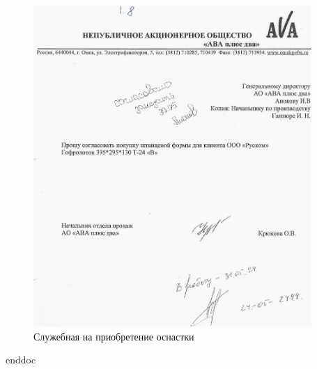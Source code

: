  \begin{figure}
 \begin{center}
   \includegraphics[height=0.94\textheight, width=0.94\textwidth, keepaspectratio]{Pics 1/1.8 приобретение оснастки_0001.jpg}
 \end{center}
   \caption{Служебная на приобретение оснастки}
   \label{pic:1.8 приобретение оснастки_0001}
 \end{figure}






%
% 

\clearpage
 {enddoc}

